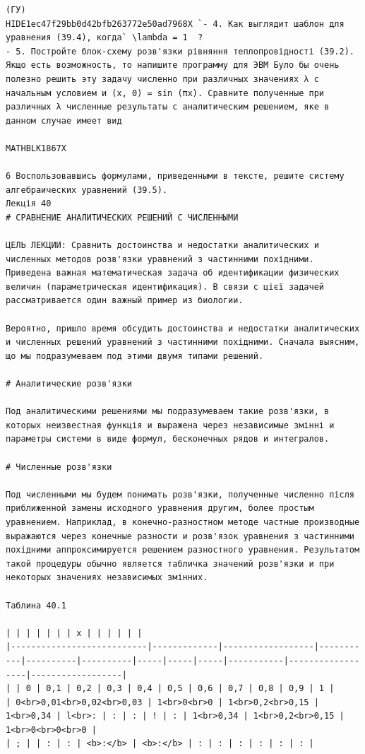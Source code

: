 \documentclass[
  ukrainian,
]{article}
\begin{document}
\begin{verbatim}
(ГУ) 
HIDE1ec47f29bb0d42bfb263772e50ad7968X `- 4. Как выглядит шаблон для уравнения (39.4), когда` \lambda = 1  ?
- 5. Постройте блок-схему розв'язки рівняння теплопровідності (39.2). Якщо есть возможность, то напишите программу для ЭВМ Було бы очень полезно решить эту задачу численно при различных значениях λ с начальным условием и (x, 0) = sin (πx). Сравните полученные при различных λ численные результаты с аналитическим решением, яке в данном случае имеет вид

MATHBLK1867X

6 Воспользовавшись формулами, приведенными в тексте, решите систему алгебраических уравнений (39.5).
Лекція 40
# СРАВНЕНИЕ АНАЛИТИЧЕСКИХ РЕШЕНИЙ С ЧИСЛЕННЫМИ

ЦЕЛЬ ЛЕКЦИИ: Сравнить достоинства и недостатки аналитических и численных методов розв'язки уравнений з частинними похідними. Приведена важная математическая задача об идентификации физических величин (параметрическая идентификация). В связи с цієї задачей рассматривается один важный пример из биологии.

Вероятно, пришло время обсудить достоинства и недостатки аналитических и численных решений уравнений з частинними похідними. Сначала выясним, що мы подразумеваем под этими двумя типами решений.

# Аналитические розв'язки

Под аналитическими решениями мы подразумеваем такие розв'язки, в которых неизвестная функція и выражена через независимые змінні и параметры системи в виде формул, бесконечных рядов и интегралов.

# Численные розв'язки

Под численными мы будем понимать розв'язки, полученные численно після приближенной замены исходного уравнения другим, более простым уравнением. Наприклад, в конечно-разностном методе частные производные выражаются через конечные разности и розв'язок уравнения з частинними похідними аппроксимируется решением разностного уравнения. Результатом такой процедуры обычно является табличка значений розв'язки и при некоторых значениях независимых змінних.

Таблина 40.1

| | | | | | | х | | | | | |
|---------------------------|-------------|------------------|-----------|----------|----------|-----|-----|-----|-----------|------------------|------------------|
| | 0 | 0,1 | 0,2 | 0,3 | 0,4 | 0,5 | 0,6 | 0,7 | 0,8 | 0,9 | 1 |
| 0<br>0,01<br>0,02<br>0,03 | 1<br>0<br>0 | 1<br>0,2<br>0,15 | 1<br>0,34 | l<br>: | : | : | ! | : | 1<br>0,34 | 1<br>0,2<br>0,15 | 1<br>0<br>0<br>0 |
| ; | | : | : | <b>:</b> | <b>:</b> | : | : | : | : | : | : |


\end{verbatim}
\end{document}
